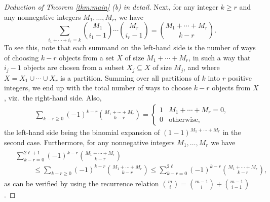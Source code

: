 \documentclass[12pt, reqno, twoside, letterpaper]{amsart}
\begin{document}
\begin{nixnix}
\begin{proof}[Deduction of Theorem \ref{thm:main} (b) in detail]
Next, for any integer $k \ge r$ and any nonnegative integers 
$M_1,\ldots,M_r$, we have 
\begin{equation}
 \label{Aeq:inc-excb3}
 \sum_{i_1 + \cdots + i_r = k}
  \binom{M_1}{i_1 - 1}
   \cdots 
    \binom{M_r}{i_r - 1}
     =
      \binom{M_1 + \cdots + M_r}{k - r}.
\end{equation}
%
To see this, note that each summand on the left-hand side is the 
number of ways of choosing $k - r$ objects from a set $X$ of size 
$M_1 + \cdots + M_r$, in such a way that $i_j - 1$ objects are 
chosen from a subset $X_j \subseteq X$ of size $M_j$, and where 
$X = X_1 \cup \cdots \cup X_r$ is a partition.
%
Summing over all partitions of $k$ into $r$ positive integers, we 
end up with the total number of ways to choose $k - r$ objects 
from $X$, viz.\ the right-hand side.
%
Also, 
\begin{align}
 \label{Aeq:inc-excb4}
 \sum_{k - r \ge 0} 
  (-1)^{k - r}
   \binom{M_1 + \cdots + M_r}{k - r}
    =
     \begin{cases}
      1 & \text{$M_1 + \cdots + M_r = 0$,} \\
      0 & \text{otherwise,}
     \end{cases}
\end{align}
the left-hand side being the binomial expansion of 
$(1 - 1)^{M_1 + \cdots + M_r}$ in the second case.
%
Furthermore, for any nonnegative integers $M_1,\ldots,M_r$ we have  
\begin{align}
 \begin{split}
  \label{Aeq:inc-excb5}
 & 
 \sum_{k - r = 0}^{2\ell + 1}
  (-1)^{k - r}
   \binom{M_1 + \cdots + M_r}{k - r}
 \\
 & \hspace{30pt}
    \le 
     \sum_{k - r \ge 0} 
      (-1)^{k - r}
       \binom{M_1 + \cdots + M_r}{k - r}
        \le 
         \sum_{k - r = 0}^{2\ell}
          (-1)^{k - r}
           \binom{M_1 + \cdots + M_r}{k - r},
  \end{split}
\end{align}
as can be verified by using the recurrence relation
$
 \binom{m}{i} = \binom{m - 1}{i} + \binom{m - 1}{i - 1}
$.


\end{proof}
\end{nixnix}
\end{document}
